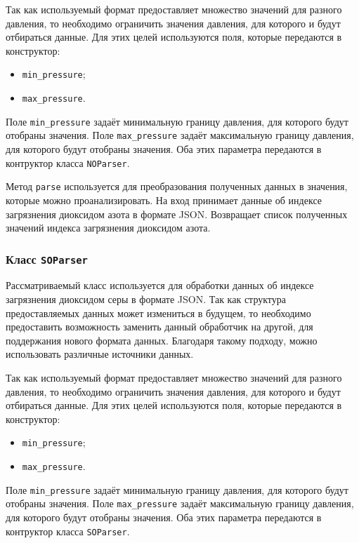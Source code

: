 Так как используемый формат предоставляет множество значений для разного давления, то необходимо ограничить значения давления, для которого и будут отбираться данные.
Для этих целей используются поля, которые передаются в конструктор:
\begin{itemize}
    \item \texttt{min\_pressure};
    \item \texttt{max\_pressure}.
\end{itemize}

Поле \texttt{min\_pressure} задаёт минимальную границу давления, для которого будут отобраны значения.
Поле \texttt{max\_pressure} задаёт максимальную границу давления, для которого будут отобраны значения.
Оба этих параметра передаются в контруктор класса \texttt{NOParser}.

Метод \texttt{parse} используется для преобразования полученных данных в значения, которые можно проанализировать.
На вход принимает данные об индексе загрязнения диоксидом азота в формате JSON.
Возвращает список полученных значений индекса загрязнения диоксидом азота.





\subsubsection{Класс \texttt{SOParser}}
Рассматриваемый класс используется для обработки данных об индексе загрязнения диоксидом серы в формате JSON.
Так как структура предоставляемых данных может измениться в будущем, то необходимо предоставить возможность заменить данный обработчик на другой, для поддержания нового формата данных.
Благодаря такому подходу, можно использовать различные источники данных.

Так как используемый формат предоставляет множество значений для разного давления, то необходимо ограничить значения давления, для которого и будут отбираться данные.
Для этих целей используются поля, которые передаются в конструктор:
\begin{itemize}
    \item \texttt{min\_pressure};
    \item \texttt{max\_pressure}.
\end{itemize}

Поле \texttt{min\_pressure} задаёт минимальную границу давления, для которого будут отобраны значения.
Поле \texttt{max\_pressure} задаёт максимальную границу давления, для которого будут отобраны значения.
Оба этих параметра передаются в контруктор класса \texttt{SOParser}.

